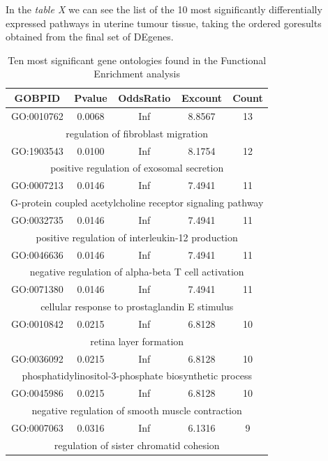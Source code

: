 \documentclass[9pt,twocolumn,twoside]{gsajnl}
\begin{document}
In the \textit{table X} we can see the list of the 10 most significantly differentially expressed pathways in uterine tumour tissue, taking the ordered goresults obtained from the final set of DEgenes. 

\begin{table}
\centering
\caption{Ten most significant gene ontologies found in the Functional Enrichment analysis}
\begin{tableminipage}{\textwidth}
 \begin{tabular}{|| c c c c c||} 
 \hline
 \textbf{GOBPID} & \textbf{Pvalue} & \textbf{OddsRatio} & \textbf{Excount} & \textbf{Count} \\ [0.5ex] 
 \hline\hline
 GO:0010762 & 0.0068 & Inf & 8.8567 & 13 \\
 \multicolumn{5}{||c||}{regulation of fibroblast migration} \\ 
 \hline
 GO:1903543 & 0.0100 & Inf & 8.1754 & 12 \\
 \multicolumn{5}{||c||}{positive regulation of exosomal secretion} \\ 
 \hline
 GO:0007213 & 0.0146 & Inf & 7.4941 & 11 \\
 \multicolumn{5}{||c||}{G-protein coupled acetylcholine receptor signaling pathway} \\ 
 \hline
 GO:0032735 & 0.0146 & Inf & 7.4941 & 11 \\
 \multicolumn{5}{||c||}{positive regulation of interleukin-12 production} \\ 
  \hline
 GO:0046636 & 0.0146 & Inf & 7.4941 & 11 \\
 \multicolumn{5}{||c||}{negative regulation of alpha-beta T cell activation} \\ 
  \hline
 GO:0071380 & 0.0146 & Inf & 7.4941 & 11 \\
 \multicolumn{5}{||c||}{cellular response to prostaglandin E stimulus} \\ 
  \hline
 GO:0010842 & 0.0215 & Inf & 6.8128 & 10 \\
 \multicolumn{5}{||c||}{retina layer formation} \\ 
  \hline
 GO:0036092 & 0.0215 & Inf & 6.8128 & 10 \\
 \multicolumn{5}{||c||}{phosphatidylinositol-3-phosphate biosynthetic process} \\ 
  \hline
 GO:0045986 & 0.0215 & Inf & 6.8128 & 10 \\
 \multicolumn{5}{||c||}{negative regulation of smooth muscle contraction} \\ 
  \hline
 GO:0007063 &  0.0316 & Inf & 6.1316 & 9 \\
 \multicolumn{5}{||c||}{regulation of sister chromatid cohesion} \\ 
 \hline
\end{tabular}
  \label{tab:shape-functions}
\end{tableminipage}
\end{table}
\end{document}
